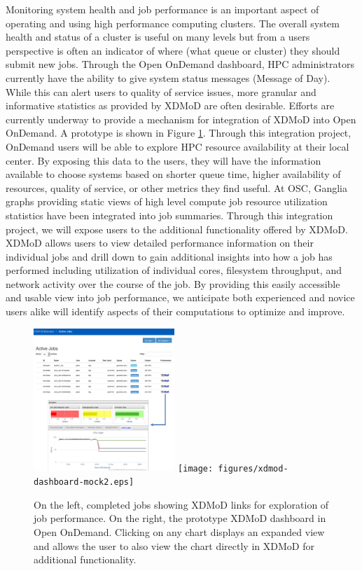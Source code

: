 \documentclass[runningheads]{llncs}
\begin{document}
Monitoring system health and job performance is an important aspect of operating and using high performance computing clusters.  The overall system health and status of a cluster is useful on many levels but from a users perspective is often an indicator of where (what queue or cluster) they should submit new jobs.  Through the Open OnDemand dashboard, HPC administrators currently have the ability to give system status messages (Message of Day).  While this can alert users to quality of service issues, more granular and informative statistics as provided by XDMoD are often desirable. Efforts are currently underway to provide a mechanism for integration of XDMoD into Open OnDemand.  A prototype is shown in Figure \ref{fig-xdmod}.
Through this integration project, OnDemand users will be able to explore HPC resource availability at their local center.  By exposing this data to the users, they will have the information available to choose systems based on shorter queue time, higher availability of resources, quality of service, or other metrics they find useful.  
At OSC, Ganglia graphs providing static views of high level compute job resource utilization statistics have been integrated into job summaries.  Through this integration project, we will expose users to the additional functionality offered by XDMoD.  XDMoD allows users to view detailed performance information on their individual jobs and drill down to gain additional insights into how a job has performed including utilization of individual cores, filesystem throughput, and network activity over the course of the job.  By providing this easily accessible and usable view into job performance, we anticipate both experienced and novice users alike will identify aspects of their computations to optimize and improve.

\begin{figure}[H]
\centering
\includegraphics[width=0.475\textwidth]{figures/jobperformance.png}
\hfill %
\texttt{[image: figures/xdmod-dashboard-mock2.eps]}
\caption{On the left, completed jobs showing XDMoD links for exploration of job performance.  On the right, the prototype XDMoD dashboard in Open OnDemand. Clicking on any chart displays an expanded view and allows the user to also view the chart directly in XDMoD for additional functionality. } \label{fig-xdmod}
\end{figure}
\end{document}
